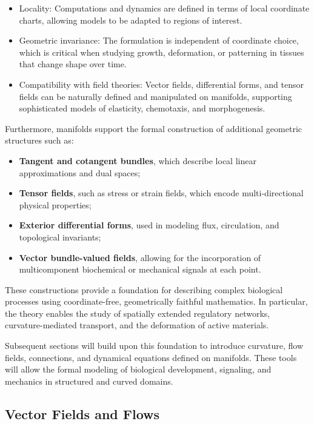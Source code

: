 \begin{itemize}
\item Locality: Computations and dynamics are defined in terms of local coordinate charts, allowing models to be adapted to regions of interest.
\item Geometric invariance: The formulation is independent of coordinate choice, which is critical when studying growth, deformation, or patterning in tissues that change shape over time.
\item Compatibility with field theories: Vector fields, differential forms, and tensor fields can be naturally defined and manipulated on manifolds, supporting sophisticated models of elasticity, chemotaxis, and morphogenesis.
\end{itemize}

Furthermore, manifolds support the formal construction of additional geometric structures such as:

\begin{itemize}
\item \textbf{Tangent and cotangent bundles}, which describe local linear approximations and dual spaces;
\item \textbf{Tensor fields}, such as stress or strain fields, which encode multi-directional physical properties;
\item \textbf{Exterior differential forms}, used in modeling flux, circulation, and topological invariants;
\item \textbf{Vector bundle-valued fields}, allowing for the incorporation of multicomponent biochemical or mechanical signals at each point.
\end{itemize}

These constructions provide a foundation for describing complex biological processes using coordinate-free, geometrically faithful mathematics. In particular, the theory enables the study of spatially extended regulatory networks, curvature-mediated transport, and the deformation of active materials.

Subsequent sections will build upon this foundation to introduce curvature, flow fields, connections, and dynamical equations defined on manifolds. These tools will allow the formal modeling of biological development, signaling, and mechanics in structured and curved domains.


\subsection{Vector Fields and Flows}

